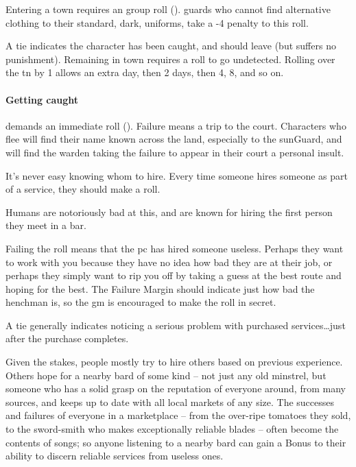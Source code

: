 \begin{multicols}{2}
Entering a town requires an  group roll (\tn[7]).
\Glspl{guard} who cannot find alternative clothing to their standard, dark, uniforms, take a -4 penalty to this roll.

A tie indicates the character has been caught, and should leave (but suffers no punishment).
Remaining in town requires a  roll to go undetected.
Rolling over the \gls{tn} by 1 allows an extra day, then 2 days, then 4, 8, and so on.

\paragraph{Getting caught}
demands an immediate  roll (\tn[10]).
Failure means a trip to the \gls{court}.
Characters who flee will find their name known across the land, especially to the \gls{sunGuard}, and will find the \gls{warden} taking the failure to appear in their \gls{court} a personal insult.

It's never easy knowing whom to hire.
Every time someone hires someone as part of a service, they should make a roll.

Humans are notoriously bad at this, and are known for hiring the first person they meet in a bar.

Failing the roll means that the \gls{pc} has hired someone useless.
Perhaps they want to work with you because they have no idea how bad they are at their job, or perhaps they simply want to rip you off by taking a guess at the best route and hoping for the best.
The Failure Margin should indicate just how bad the henchman is, so the \gls{gm} is encouraged to make the roll in secret.

A tie generally indicates noticing a serious problem with purchased services\ldots just after the purchase completes.

Given the stakes, people mostly try to hire others based on previous experience.
Others hope for a nearby bard of some kind -- not just any old minstrel, but someone who has a solid grasp on the reputation of everyone around, from many sources, and keeps up to date with all local markets of any size.
The successes and failures of everyone in a marketplace -- from the over-ripe tomatoes they sold, to the sword-smith who makes exceptionally reliable blades -- often become the contents of songs; so anyone listening to a nearby bard can gain a Bonus to their ability to discern reliable services from useless ones.


\end{multicols}
